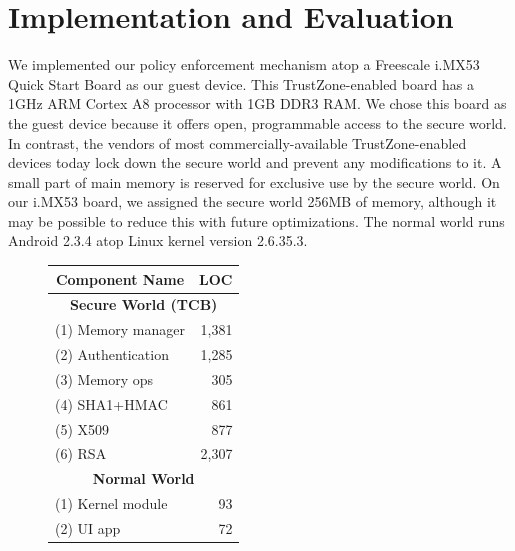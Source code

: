 \section{Implementation and Evaluation}
\label{section:evaluation}

We implemented our policy enforcement mechanism atop a Freescale i.MX53 Quick
Start Board as our guest device. This TrustZone-enabled board has a 1GHz ARM
Cortex A8 processor with 1GB DDR3 RAM. We chose this board as the guest device
because it offers open, programmable access to the secure world. In contrast,
the vendors of most commercially-available TrustZone-enabled devices today lock
down the secure world and prevent any modifications to it. A small part of main
memory is reserved for exclusive use by the secure world. On our i.MX53 board,
we assigned the secure world 256MB of memory, although it may be possible to
reduce this with future optimizations. The normal world runs Android 2.3.4 atop
Linux kernel version 2.6.35.3.

\begin{figure}
\footnotesize
\renewcommand{\arraystretch}{0.75}
\centering
\indent\vspace{-0.5cm}
\begin{tabular}{|l|r|}
\hline
\multicolumn{1}{|c|}{\bf Component Name} & \multicolumn{1}{|c|}{\bf LOC}\\
\hline
\hline
\multicolumn{2}{|c|}{\bf Secure World (TCB)}\\
\hline
(1) Memory manager            & 1,381\\
(2) Authentication            & 1,285\\
(3) Memory ops                & 305\\
\hline
(4) SHA1+HMAC                 & 861\\
(5) X509                      & 877\\
(6) RSA                       & 2,307\\
\hline
\hline
\multicolumn{2}{|c|}{\bf Normal World}\\
\hline
(1) Kernel module             & 93\\
(2) UI app                    & 72\\
\hline
\end{tabular}
\indent\vspace{-0.3cm}
{\label{table:loc}}
\indent\vspace{-0.45cm}
\end{figure}

